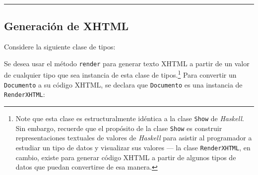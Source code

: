 \begin{center}\rule{3in}{0.4pt}\end{center}

\subsection{Generación de XHTML}\label{generaciuxf3n-de-xhtml}

Considere la siguiente clase de tipos:

\begin{Shaded}
\begin{Highlighting}[]
  
 \OtherTok{->} 
\end{Highlighting}
\end{Shaded}

Se desea usar el método \texttt{render} para generar texto XHTML a
partir de un valor de cualquier tipo que sea instancia de esta clase de
tipos.\footnote{Note que esta clase es estructuralmente idéntica a la
  clase \texttt{Show} de \emph{Haskell}. Sin embargo, recuerde que el
  propósito de la clase \texttt{Show} es construir representaciones
  textuales de valores de \emph{Haskell} para asistir al programador a
  estudiar un tipo de datos y visualizar sus valores --- la clase
  \texttt{RenderXHTML}, en cambio, existe para generar código XHTML a
  partir de algunos tipos de datos que puedan convertirse de esa manera.}
Para convertir un \texttt{Documento} a su código XHTML, se declara que
\texttt{Documento} es una instancia de \texttt{RenderXHTML}:

\begin{Shaded}
\begin{Highlighting}[]
   
        \FunctionTok{=} 
          \NormalTok{[ }
          \NormalTok{, }
          \NormalTok{, }
          \NormalTok{, }
          \NormalTok{]}
\end{Highlighting}
\end{Shaded}

